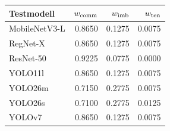 \begin{tabular}{@{}lrrr@{}}
\toprule
Testmodell & $w_{\rm comm}$ & $w_{\rm imb}$ & $w_{\rm ten}$ \\
\midrule
MobileNetV3-L & 0.8650 & 0.1275 & 0.0075 \\
RegNet-X & 0.8650 & 0.1275 & 0.0075 \\
ResNet-50 & 0.9225 & 0.0775 & 0.0000 \\
YOLO11l & 0.8650 & 0.1275 & 0.0075 \\
YOLO26m & 0.7150 & 0.2775 & 0.0075 \\
YOLO26s & 0.7100 & 0.2775 & 0.0125 \\
YOLOv7 & 0.8650 & 0.1275 & 0.0075 \\
\bottomrule
\end{tabular}
